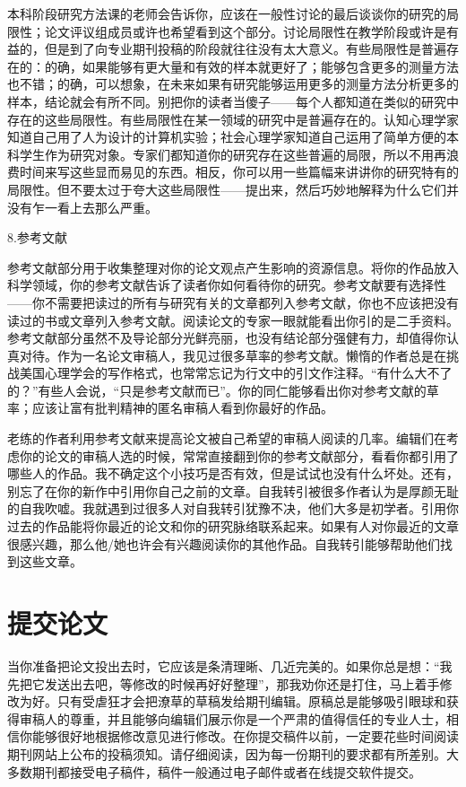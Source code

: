 本科阶段研究方法课的老师会告诉你，应该在一般性讨论的最后谈谈你的研究的局限性；论文评议组成员或许也希望看到这个部分。讨论局限性在教学阶段或许是有益的，但是到了向专业期刊投稿的阶段就往往没有太大意义。有些局限性是普遍存在的：的确，如果能够有更大量和有效的样本就更好了；能够包含更多的测量方法也不错；的确，可以想象，在未来如果有研究能够运用更多的测量方法分析更多的样本，结论就会有所不同。别把你的读者当傻子——每个人都知道在类似的研究中存在的这些局限性。有些局限性在某一领域的研究中是普遍存在的。认知心理学家知道自己用了人为设计的计算机实验；社会心理学家知道自己运用了简单方便的本科学生作为研究对象。专家们都知道你的研究存在这些普遍的局限，所以不用再浪费时间来写这些显而易见的东西。相反，你可以用一些篇幅来讲讲你的研究特有的局限性。但不要太过于夸大这些局限性——提出来，然后巧妙地解释为什么它们并没有乍一看上去那么严重。

{\kaishu 8.参考文献}

参考文献部分用于收集整理对你的论文观点产生影响的资源信息。将你的作品放入科学领域，你的参考文献告诉了读者你如何看待你的研究。参考文献要有选择性——你不需要把读过的所有与研究有关的文章都列入参考文献，你也不应该把没有读过的书或文章列入参考文献。阅读论文的专家一眼就能看出你引的是二手资料。参考文献部分虽然不及导论部分光鲜亮丽，也没有结论部分强健有力，却值得你认真对待。作为一名论文审稿人，我见过很多草率的参考文献。懒惰的作者总是在挑战美国心理学会的写作格式，也常常忘记为行文中的引文作注释。“有什么大不了的？”有些人会说，“只是参考文献而已”。你的同仁能够看出你对参考文献的草率；应该让富有批判精神的匿名审稿人看到你最好的作品。

老练的作者利用参考文献来提高论文被自己希望的审稿人阅读的几率。编辑们在考虑你的论文的审稿人选的时候，常常直接翻到你的参考文献部分，看看你都引用了哪些人的作品。我不确定这个小技巧是否有效，但是试试也没有什么坏处。还有，别忘了在你的新作中引用你自己之前的文章。自我转引被很多作者认为是厚颜无耻的自我吹嘘。我就遇到过很多人对自我转引犹豫不决，他们大多是初学者。引用你过去的作品能将你最近的论文和你的研究脉络联系起来。如果有人对你最近的文章很感兴趣，那么他/她也许会有兴趣阅读你的其他作品。自我转引能够帮助他们找到这些文章。


\section{提交论文}
当你准备把论文投出去时，它应该是条清理晰、几近完美的。如果你总是想：“我先把它发送出去吧，等修改的时候再好好整理”，那我劝你还是打住，马上着手修改为好。只有受虐狂才会把潦草的草稿发给期刊编辑。原稿总是能够吸引眼球和获得审稿人的尊重，并且能够向编辑们展示你是一个严肃的值得信任的专业人士，相信你能够很好地根据修改意见进行修改。在你提交稿件以前，一定要花些时间阅读期刊网站上公布的投稿须知。请仔细阅读，因为每一份期刊的要求都有所差别。大多数期刊都接受电子稿件，稿件一般通过电子邮件或者在线提交软件提交。

